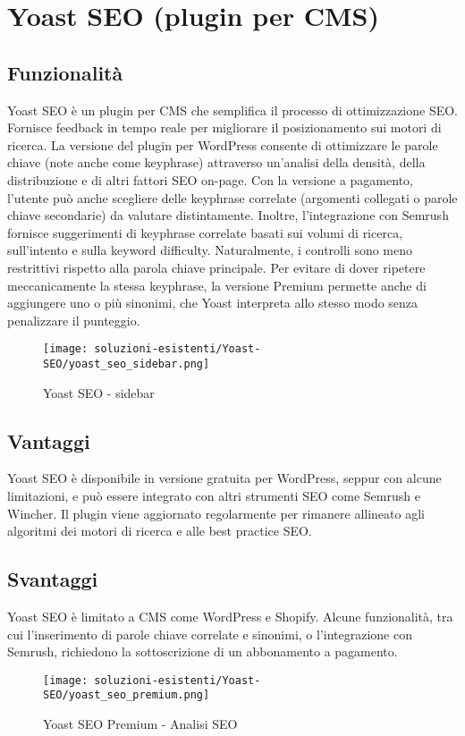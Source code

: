 \section{Yoast SEO (plugin per CMS)}

\subsection{Funzionalità}
\par Yoast SEO è un plugin per CMS che semplifica il processo di ottimizzazione SEO. Fornisce feedback in tempo reale per migliorare il posizionamento sui motori di ricerca. La versione del plugin per WordPress consente di ottimizzare le parole chiave (note anche come keyphrase) attraverso un’analisi della densità, della distribuzione e di altri fattori SEO on-page. Con la versione a pagamento, l’utente può anche scegliere delle keyphrase correlate (argomenti collegati o parole chiave secondarie) da valutare distintamente. Inoltre, l’integrazione con Semrush fornisce suggerimenti di keyphrase correlate basati sui volumi di ricerca, sull’intento e sulla keyword difficulty. Naturalmente, i controlli sono meno restrittivi rispetto alla parola chiave principale. Per evitare di dover ripetere meccanicamente la stessa keyphrase, la versione Premium permette anche di aggiungere uno o più sinonimi, che Yoast interpreta allo stesso modo senza penalizzare il punteggio.

\begin{figure}[H]
    \centering 
    \texttt{[image: soluzioni-esistenti/Yoast-SEO/yoast\_seo\_sidebar.png]} 
    \caption{Yoast SEO - sidebar}
\end{figure}

\subsection{Vantaggi}
\par Yoast SEO è disponibile in versione gratuita per WordPress, seppur con alcune limitazioni, e può essere integrato con altri strumenti SEO come Semrush e Wincher. Il plugin viene aggiornato regolarmente per rimanere allineato agli algoritmi dei motori di ricerca e alle best practice SEO.

\subsection{Svantaggi}
\par Yoast SEO è limitato a CMS come WordPress e Shopify. Alcune funzionalità, tra cui l’inserimento di parole chiave correlate e sinonimi, o l'integrazione con Semrush, richiedono la sottoscrizione di un abbonamento a pagamento.

\begin{figure}[H]
    \centering 
    \texttt{[image: soluzioni-esistenti/Yoast-SEO/yoast\_seo\_premium.png]} 
    \caption{Yoast SEO Premium - Analisi SEO}
\end{figure}